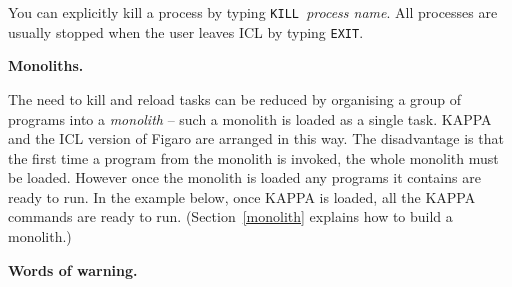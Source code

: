 \documentclass[twoside,11pt,nolof]{starlink}
\begin{document}
You can explicitly kill a process by typing \texttt{KILL }{\sl process name}.
All processes are usually stopped when the user leaves ICL by typing
\texttt{EXIT}.

\newpage
{\large\bf Monoliths.}

The need to kill and reload tasks can be reduced by organising
a group of programs into a {\sl monolith} -- such a monolith is loaded
as a single task.
KAPPA and the ICL version of Figaro are arranged in this way.
The disadvantage is that the first time a program from the monolith
is invoked, the whole monolith must be loaded.
However once the monolith is loaded any programs it contains are ready to
run. In the example below, once KAPPA is loaded, all the KAPPA commands are
ready to run.
(Section~\ref{monolith} explains how to build a monolith.)

{\large\bf Words of warning.}
\end{document}
